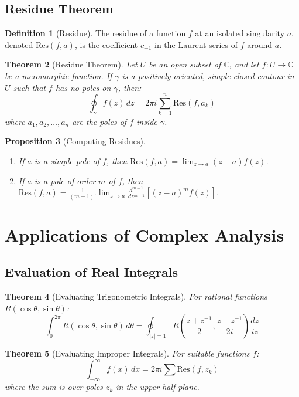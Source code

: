 \documentclass[12pt,a4paper]{article}
\theoremstyle{plain}
\newtheorem{theorem}{Theorem}[section]
\newtheorem{proposition}[theorem]{Proposition}
\theoremstyle{definition}
\newtheorem{definition}[theorem]{Definition}
\begin{document}
\subsection{Residue Theorem}

\begin{definition}[Residue]
The residue of a function $f$ at an isolated singularity $a$, denoted $\text{Res}(f, a)$, is the coefficient $c_{-1}$ in the Laurent series of $f$ around $a$.
\end{definition}

\begin{theorem}[Residue Theorem]
Let $U$ be an open subset of $\mathbb{C}$, and let $f: U \to \mathbb{C}$ be a meromorphic function. If $\gamma$ is a positively oriented, simple closed contour in $U$ such that $f$ has no poles on $\gamma$, then:
\[\oint_{\gamma} f(z) \, dz = 2\pi i \sum_{k=1}^{n} \text{Res}(f, a_k)\]
where $a_1, a_2, \ldots, a_n$ are the poles of $f$ inside $\gamma$.
\end{theorem}

\begin{proposition}[Computing Residues]
\begin{enumerate}[label=(\roman*)]
\item If $a$ is a simple pole of $f$, then $\text{Res}(f, a) = \lim_{z \to a} (z-a)f(z)$.
\item If $a$ is a pole of order $m$ of $f$, then $\text{Res}(f, a) = \frac{1}{(m-1)!} \lim_{z \to a} \frac{d^{m-1}}{dz^{m-1}}[(z-a)^m f(z)]$.
\end{enumerate}
\end{proposition}

\section{Applications of Complex Analysis}

\subsection{Evaluation of Real Integrals}

\begin{theorem}[Evaluating Trigonometric Integrals]
For rational functions $R(\cos\theta, \sin\theta)$:
\[\int_{0}^{2\pi} R(\cos\theta, \sin\theta) \, d\theta = \oint_{|z|=1} R\left(\frac{z+z^{-1}}{2}, \frac{z-z^{-1}}{2i}\right) \frac{dz}{iz}\]
\end{theorem}

\begin{theorem}[Evaluating Improper Integrals]
For suitable functions $f$:
\[\int_{-\infty}^{\infty} f(x) \, dx = 2\pi i \sum \text{Res}(f, z_k)\]
where the sum is over poles $z_k$ in the upper half-plane.
\end{theorem}
\end{document}
